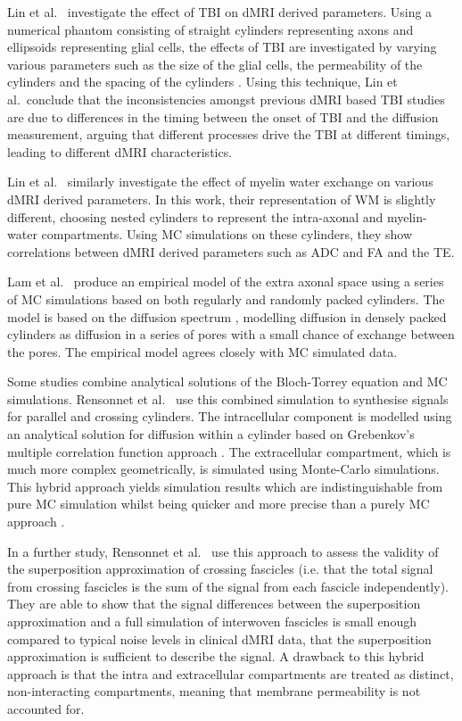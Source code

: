 Lin et al.\ \cite{Lin2016} investigate the effect of \ac{TBI} on \ac{dMRI} derived parameters.
Using a numerical phantom consisting of straight cylinders representing axons and ellipsoids representing glial cells, the effects of \ac{TBI} are investigated by varying various parameters such as the size of the glial cells, the permeability of the cylinders and the spacing of the cylinders \cite{Lin2016}. 
Using this technique, Lin et al.\ conclude that the inconsistencies amongst previous \ac{dMRI} based \ac{TBI} studies \cite{Huisman2004,Bazarian2007,Rutgers2008} are due to differences in the timing between the onset of \ac{TBI} and the diffusion measurement, arguing that different processes drive the \ac{TBI} at different timings, leading to different \ac{dMRI} characteristics. 

Lin et al.\ \cite{Lin2017} similarly investigate the effect of myelin water exchange on various \ac{dMRI} derived parameters. In this work, their representation of \ac{WM} is slightly different, choosing nested cylinders to represent the intra-axonal and myelin-water compartments.
Using \ac{MC} simulations on these cylinders, they show correlations between \ac{dMRI} derived parameters such as \ac{ADC} and \ac{FA} and the \acl{TE}.

Lam et al.\ \cite{Lam2015} produce an empirical model of the extra axonal space using a series of \ac{MC} simulations based on both regularly and randomly packed cylinders. The model is based on the diffusion spectrum \cite{Stepisnik1993}, modelling diffusion in densely packed cylinders as diffusion in a series of pores with a small chance of exchange between the pores.
The empirical model agrees closely with \ac{MC} simulated data.

Some studies combine analytical solutions of the Bloch-Torrey equation and \ac{MC} simulations.
Rensonnet et al.\ \cite{Rensonnet2015} use this combined simulation to synthesise signals for parallel and crossing cylinders.
The intracellular component is modelled using an analytical solution for diffusion within a cylinder based on Grebenkov's multiple correlation function approach \cite{Grebenkov2008}.
The extracellular compartment, which is much more complex geometrically, is simulated using Monte-Carlo simulations.
This hybrid approach yields simulation results which are indistinguishable from pure \ac{MC} simulation whilst being quicker and more precise than a purely \ac{MC} approach \cite{Rensonnet2015}. 

In a further study, Rensonnet et al.\ \cite{Rensonnet2017} use this approach to assess the validity of the superposition approximation of crossing fascicles (i.e. that the total signal from crossing fascicles is the sum of the signal from each fascicle independently).
They are able to show that the signal differences between the superposition approximation and a full simulation of interwoven fascicles is small enough compared to typical noise levels in clinical \ac{dMRI} data, that the superposition approximation is sufficient to describe the signal.
A drawback to this hybrid approach is that the intra and extracellular compartments are treated as distinct, non-interacting compartments, meaning that membrane permeability is not accounted for.

